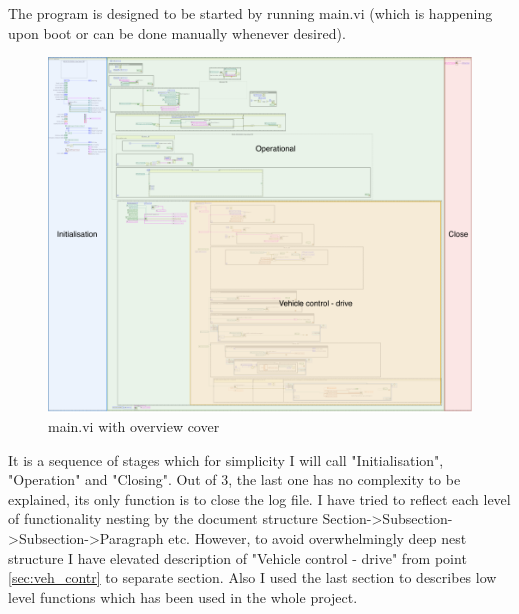 \def\visc{0.6}
\label{apx:doc}
The program is designed to be started by running main.vi (which is happening upon boot or can be done manually whenever desired).
\begin{figure}[!h]
    \centering
    \includegraphics[width=\textwidth]{figures/VI_over.pdf}
    \caption{main.vi with overview cover}
    \label{vi:main}
\end{figure}

It is a sequence of stages which for simplicity I will call "Initialisation", "Operation" and "Closing". Out of 3, the last one has no complexity to be explained, its only function is to close the log file. 
I have tried to reflect each level of functionality nesting by the document structure Section->Subsection->Subsection->Paragraph etc. However, to avoid overwhelmingly deep nest structure I have elevated description of "Vehicle control - drive" from point \ref{sec:veh_contr} to separate section. Also I used the last section to describes low level functions which has been used in the whole project.

